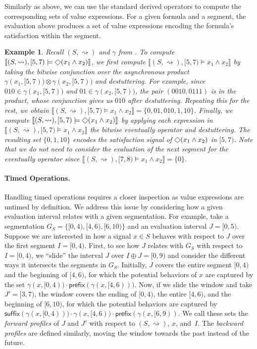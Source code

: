 \documentclass[iicol,lineno]{sn-jnl}
\renewcommand{\cref}{\Cref}
\renewcommand{\pfx}{\textsf{prefix}}
\renewcommand{\sfx}{\textsf{suffix}}
\newcommand{\hb}{\rightsquigarrow}
\renewcommand{\LTLf}{\LTLdiamond}
\let\LTLeventually\LTLf
\newcommand{\?}{\text{?}}
\newtheorem{example}{Example}
\begin{document}
	Similarly as above, we can use the standard derived operators to compute the corresponding sets of value expressions.
	For a given formula and a segment, the evaluation above produces a set of value expressions encoding the formula's satisfaction within the segment.
	
	\begin{example}
		Recall $(S, {\hb})$ and $\gamma$ from \cref{fig:csve}.
		To compute $\llbracket (S, {\hb}), [5,7) \models \LTLeventually(x_1 \land x_2) \rrbracket$, we first compute $\llbracket (S, {\hb}), [5,7) \models x_1 \land x_2 \rrbracket$ by taking the bitwise conjunction over the asynchronous product $\gamma(x_1, [5,7)) \otimes \gamma(x_2, [5,7))$ and destuttering.
		For example, since $010 \in \gamma(x_1, [5,7))$ and $01 \in \gamma(x_2, [5,7))$, the pair $(0010,0111)$ is in the product, whose conjunction gives us $010$ after destuttering. 
		Repeating this for the rest, we obtain $\llbracket (S, {\hb}), [5,7) \models x_1 \land x_2 \rrbracket = \{ 0, 01, 010, 1, 10 \}$.
		Finally, we compute $\llbracket (S, {\hb}), [5,7) \models \LTLeventually(x_1 \land x_2) \rrbracket$ by applying each expression in $\llbracket (S, {\hb}), [5,7) \models x_1 \land x_2 \rrbracket$ the bitwise eventually operator and destuttering.
		The resulting set $\{0, 1, 10\}$ encodes the satisfaction signal of $\LTLeventually(x_1 \land x_2)$ in $[5,7)$.
		Note that we do not need to consider the evaluation of the next segment for the eventually operator since $\llbracket (S, {\hb}), [7,8) \models x_1 \land x_2 \rrbracket = \{0\}$.
	\end{example}
	
	\paragraph*{Timed Operations.}
	Handling timed operations requires a closer inspection as value expressions are untimed by definition.
	We address this issue by considering how a given evaluation interval relates with a given segmentation.
	For example, take a segmentation $G_S = \{ [0,4), [4,6), [6,10) \}$ and an evaluation interval $J = [0,5)$.
	Suppose we are interested in how a signal $x \in S$ behaves with respect to $J$ over the first segment $I = [0,4)$.
	First, to see how $J$ relates with $G_S$ with respect to $I =[0,4)$, we  ``slide'' the interval $J$ over $I \oplus J = [0,9)$ and consider the different ways it intersects the segments in $G_S$.
	Initially, $J$ covers the entire segment $[0,4)$ and the beginning of $[4,6)$, for which the potential behaviors of $x$ are captured by the set $\gamma(x, [0,4)) \cdot \pfx(\gamma(x, [4,6)))$.
	Now, if we slide the window and take $J' = [3,7)$, the window covers the ending of $[0,4)$, the entire $[4,6)$, and the beginning of $[6,10)$, for which the potential behaviors are captured by $\sfx(\gamma(x, [0,4))) \cdot \gamma(x, [4,6)) \cdot \pfx(\gamma(x, [6,9))$.
	We call these sets the \emph{forward profiles} of $J$ and $J'$ with respect to $(S,{\hb})$, $x$, and~$I$.
	The \emph{backward profiles} are defined similarly, moving the window towards the past instead of the future.
	
\end{document}
